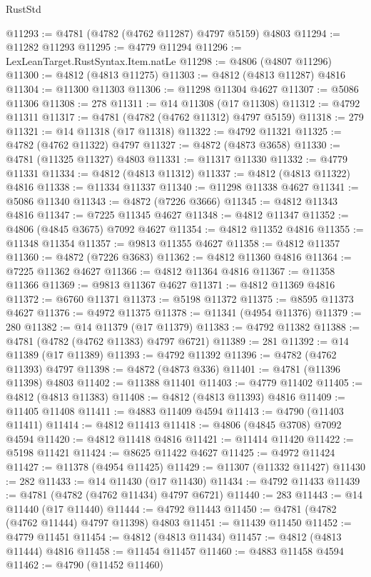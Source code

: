 \begin{lexlean}{RustStd}
\begin{coremodule}
@11293 := @4781 (@4782 (@4762 @11287) @4797 @5159) @4803
@11294 := @11282 @11293
@11295 := @4779 @11294
@11296 := LexLeanTarget.RustSyntax.Item.natLe
@11298 := @4806 (@4807 @11296)
@11300 := @4812 (@4813 @11275)
@11303 := @4812 (@4813 @11287) @4816
@11304 := @11300 @11303
@11306 := @11298 @11304 @4627
@11307 := @5086 @11306
@11308 := 278
@11311 := @14 @11308 (@17 @11308)
@11312 := @4792 @11311
@11317 := @4781 (@4782 (@4762 @11312) @4797 @5159)
@11318 := 279
@11321 := @14 @11318 (@17 @11318)
@11322 := @4792 @11321
@11325 := @4782 (@4762 @11322) @4797
@11327 := @4872 (@4873 @3658)
@11330 := @4781 (@11325 @11327) @4803
@11331 := @11317 @11330
@11332 := @4779 @11331
@11334 := @4812 (@4813 @11312)
@11337 := @4812 (@4813 @11322) @4816
@11338 := @11334 @11337
@11340 := @11298 @11338 @4627
@11341 := @5086 @11340
@11343 := @4872 (@7226 @3666)
@11345 := @4812 @11343 @4816
@11347 := @7225 @11345 @4627
@11348 := @4812 @11347
@11352 := @4806 (@4845 @3675) @7092 @4627
@11354 := @4812 @11352 @4816
@11355 := @11348 @11354
@11357 := @9813 @11355 @4627
@11358 := @4812 @11357
@11360 := @4872 (@7226 @3683)
@11362 := @4812 @11360 @4816
@11364 := @7225 @11362 @4627
@11366 := @4812 @11364 @4816
@11367 := @11358 @11366
@11369 := @9813 @11367 @4627
@11371 := @4812 @11369 @4816
@11372 := @6760 @11371
@11373 := @5198 @11372
@11375 := @8595 @11373 @4627
@11376 := @4972 @11375
@11378 := @11341 (@4954 @11376)
@11379 := 280
@11382 := @14 @11379 (@17 @11379)
@11383 := @4792 @11382
@11388 := @4781 (@4782 (@4762 @11383) @4797 @6721)
@11389 := 281
@11392 := @14 @11389 (@17 @11389)
@11393 := @4792 @11392
@11396 := @4782 (@4762 @11393) @4797
@11398 := @4872 (@4873 @336)
@11401 := @4781 (@11396 @11398) @4803
@11402 := @11388 @11401
@11403 := @4779 @11402
@11405 := @4812 (@4813 @11383)
@11408 := @4812 (@4813 @11393) @4816
@11409 := @11405 @11408
@11411 := @4883 @11409 @4594
@11413 := @4790 (@11403 @11411)
@11414 := @4812 @11413
@11418 := @4806 (@4845 @3708) @7092 @4594
@11420 := @4812 @11418 @4816
@11421 := @11414 @11420
@11422 := @5198 @11421
@11424 := @8625 @11422 @4627
@11425 := @4972 @11424
@11427 := @11378 (@4954 @11425)
@11429 := @11307 (@11332 @11427)
@11430 := 282
@11433 := @14 @11430 (@17 @11430)
@11434 := @4792 @11433
@11439 := @4781 (@4782 (@4762 @11434) @4797 @6721)
@11440 := 283
@11443 := @14 @11440 (@17 @11440)
@11444 := @4792 @11443
@11450 := @4781 (@4782 (@4762 @11444) @4797 @11398) @4803
@11451 := @11439 @11450
@11452 := @4779 @11451
@11454 := @4812 (@4813 @11434)
@11457 := @4812 (@4813 @11444) @4816
@11458 := @11454 @11457
@11460 := @4883 @11458 @4594
@11462 := @4790 (@11452 @11460)

\end{coremodule}
\end{lexlean}
